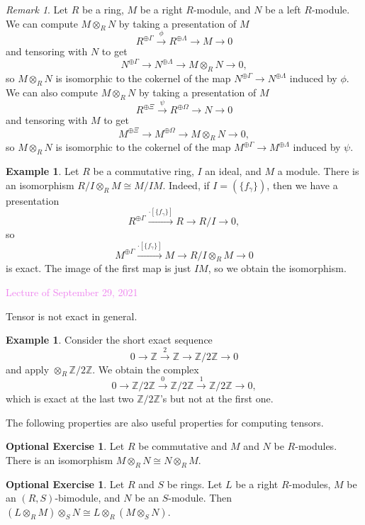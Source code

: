 \documentclass{amsart}[12pt]
\newcommand{\Sept}[1]{\textcolor{violet}{Lecture of September #1, 2021}}
\newcommand{\Z}{\mathbb{Z}}
\numberwithin{equation}{section}
\theoremstyle{plain} %
\theoremstyle{definition}
\newtheorem{ex}[equation]{Example}
\newtheorem{exer}[equation]{Optional Exercise}
\theoremstyle{remark}
\newtheorem{rem}[equation]{Remark}
\newcommand{\xra}[1]{\xrightarrow{#1}}
\begin{document}
\begin{rem}
Let $R$ be a ring, $M$ be a right $R$-module, and $N$ be a left $R$-module. We can compute $M\otimes_R N$ by taking a presentation of $M$
\[ R^{\oplus \Gamma} \xra {\phi} R^{\oplus \Lambda} \to M \to 0\]
and tensoring with $N$ to get
\[ N^{\oplus \Gamma} \xra{} N^{\oplus \Lambda} \to M \otimes_R N \to 0,\]
so $M\otimes_R N$ is isomorphic to the cokernel of the map $N^{\oplus \Gamma} \to N^{\oplus \Lambda}$ induced by $\phi$. We can also compute $M\otimes_R N$ by taking a presentation of $M$
\[ R^{\oplus \Xi} \xra {\psi} R^{\oplus \Omega} \to N \to 0\]
and tensoring with $M$ to get
\[ M^{\oplus \Xi} \xra{} M^{\oplus \Omega} \to M \otimes_R N \to 0,\]
so $M\otimes_R N$ is isomorphic to the cokernel of the map $M^{\oplus \Gamma} \to M^{\oplus \Lambda}$ induced by $\psi$. 
\end{rem}

\begin{ex}
Let $R$ be a commutative ring, $I$ an ideal, and $M$ a module. There is an isomorphism
$R/I \otimes_R M \cong M/IM$. Indeed, if $I=(\{f_\gamma\})$, then we have a presentation
\[ R^{\oplus \Gamma} \xra{\cdot [ \{f_\gamma\} ] } R \to R/I \to 0,\]
so
\[ M^{\oplus \Gamma} \xra{\cdot [ \{f_\gamma\} ] } M \to R/I \otimes_R M \to 0\]
is exact. The image of the first map is just $IM$, so we obtain the isomorphism.
\end{ex}

\Sept{29}

Tensor is not exact in general.

\begin{ex} Consider the short exact sequence 
\[ 0 \to \Z \xra{2} \Z \to \Z/2\Z \to 0\] and apply $\otimes_R \Z/2\Z$. We obtain the complex
\[ 0 \to \Z/2\Z \xra{0} \Z/2\Z \xra{1} \Z/2\Z \to 0,\]
which is exact at the last two $\Z/2\Z$'s but not at the first one.
\end{ex}

The following properties are also useful properties for computing tensors.

\begin{exer} Let $R$ be commutative and $M$ and $N$ be $R$-modules. There is an isomorphism $M\otimes_R N \cong N \otimes_R M$.
\end{exer}

\begin{exer} Let $R$ and $S$ be rings. Let $L$ be a right $R$-modules, $M$ be an $(R,S)$-bimodule, and $N$ be an $S$-module. Then $(L\otimes_R M) \otimes_S N \cong L \otimes_R (M\otimes_S N)$.
\end{exer}
\end{document}
